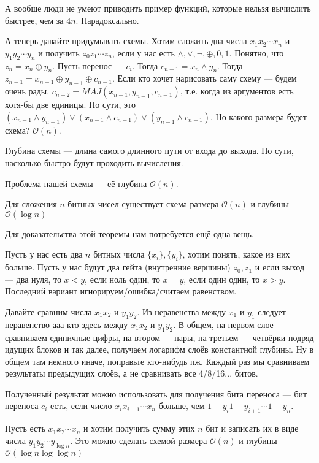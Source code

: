А вообще люди не умеют приводить пример функций, которые нельзя вычислить быстрее, чем за $4n$. Парадоксально. 

А теперь давайте придумывать схемы. Хотим сложить два числа $x_1 x_2 \cdots x_n$ и $y_1 y_2 \cdots y_n$ и получить $z_0 z_1 \cdots z_n$, если у нас есть $\land, \lor, \lnot, \oplus, 0, 1$. Понятно, что $z_n = x_n \oplus y_n$.  Пусть перенос --- $c_i$. Тогда $c_{n-1} = x_n \land y_n$. Тогда $z_{n-1} = x_{n-1} \oplus y_{n-1} \oplus c_{n-1}$. Если кто хочет нарисовать саму схему --- будем очень рады. $c_{n-2} = MAJ(x_{n-1}, y_{n-1}, c_{n-1})$, т.е. когда из аргументов есть хотя-бы две единицы. По сути, это $(x_{n-1} \land y_{n-1}) \lor (x_{n-1} \land c_{n-1}) \lor (y_{n-1} \land c_{n-1})$. Но какого размера будет схема? $\mathcal{O}(n)$.

\begin{definition}
	Глубина схемы --- длина самого длинного пути от входа до выхода. По сути, насколько быстро будут проходить вычисления. 
\end{definition}

Проблема нашей схемы --- её глубина $\mathcal{O}(n)$. 

\begin{theorem}
	Для сложения $n$-битных чисел существует схема размера $\mathcal{O}(n)$ и глубины $\mathcal{O}(\log n)$
\end{theorem}

Для доказательства этой теоремы нам потребуется ещё одна вещь. 

Пусть у нас есть два $n$ битных числа $\{x_i\}, \{y_i\}$, хотим понять, какое из них больше. Пусть у нас будут два гейта (внутренние вершины) $z_0, z_1$ и если выход --- два нуля, то $x < y$, если ноль один, то $x = y$, если один один, то $x > y$. Последний вариант игнорируем/ошибка/считаем равенством. 

Давайте сравним числа $x_1 x_2$ и $y_1 y_2$. Из неравенства между $x_1$ и $y_1$ следует неравенство ааа кто здесь между $x_1 x_2$ и $y_1 y_2$. В общем, на первом слое сравниваем единичные цифры, на втором --- пары, на третьем --- четвёрки подряд идущих блоков и так далее, получаем логарифм слоёв константной глубины. Ну в общем там немного иначе, поправьте кто-нибудь пж. Каждый раз мы сравниваем результаты предыдущих слоёв, а не сравнивать все 4/8/16... битов. 

Полученный результат можно использовать для получения бита переноса --- бит переноса $c_i$ есть, если число $x_i x_{i+1} \cdots x_n$ больше, чем $1-y_i 1-y_{i+1} \cdots 1-y_n$. 

\begin{theorem}
	Пусть есть $x_1 x_2 \cdots x_n$ и хотим получить сумму этих $n$ бит и записать их в виде числа $y_1 y_2 \cdots y_{\log n}$. Это можно сделать схемой размера $\mathcal{O}(n)$ и глубины $\mathcal{O}(\log n \log \log n)$
\end{theorem}
